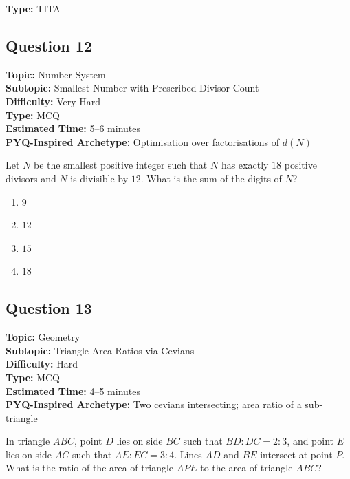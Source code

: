 \documentclass[11pt]{article}
\begin{document}
\textbf{Type:} TITA

\subsection*{Question 12}

\textbf{Topic:} Number System \\
\textbf{Subtopic:} Smallest Number with Prescribed Divisor Count \\
\textbf{Difficulty:} Very Hard \\
\textbf{Type:} MCQ \\
\textbf{Estimated Time:} 5--6 minutes \\
\textbf{PYQ-Inspired Archetype:} Optimisation over factorisations of \(d(N)\)

\begin{tcolorbox}
Let \(N\) be the smallest positive integer such that \(N\) has exactly \(18\) positive divisors and \(N\) is divisible by \(12\). What is the sum of the digits of \(N\)?
\end{tcolorbox}

\begin{enumerate}[label=(\Alph*)]
    \item \(9\)
    \item \(12\)
    \item \(15\)
    \item \(18\)
\end{enumerate}

\subsection*{Question 13}

\textbf{Topic:} Geometry \\
\textbf{Subtopic:} Triangle Area Ratios via Cevians \\
\textbf{Difficulty:} Hard \\
\textbf{Type:} MCQ \\
\textbf{Estimated Time:} 4--5 minutes \\
\textbf{PYQ-Inspired Archetype:} Two cevians intersecting; area ratio of a sub-triangle

\begin{tcolorbox}
In triangle \(ABC\), point \(D\) lies on side \(BC\) such that \(BD:DC = 2:3\), and point \(E\) lies on side \(AC\) such that \(AE:EC = 3:4\). Lines \(AD\) and \(BE\) intersect at point \(P\). What is the ratio of the area of triangle \(APE\) to the area of triangle \(ABC\)?
\end{tcolorbox}
\end{document}
